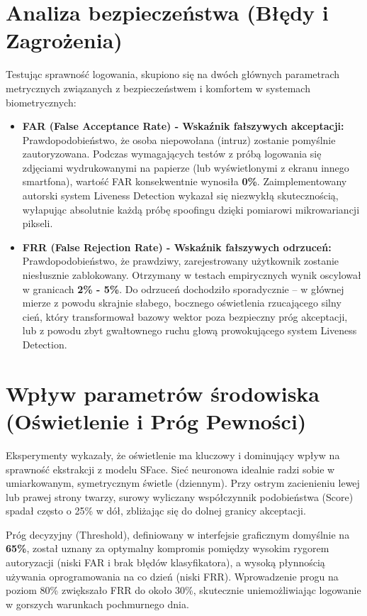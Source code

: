 \section{Analiza bezpieczeństwa (Błędy i Zagrożenia)}
Testując sprawność logowania, skupiono się na dwóch głównych parametrach metrycznych związanych z bezpieczeństwem i komfortem w systemach biometrycznych:

\begin{itemize}
    \item \textbf{FAR (False Acceptance Rate) - Wskaźnik fałszywych akceptacji:} Prawdopodobieństwo, że osoba niepowołana (intruz) zostanie pomyślnie zautoryzowana. Podczas wymagających testów z próbą logowania się zdjęciami wydrukowanymi na papierze (lub wyświetlonymi z ekranu innego smartfona), wartość FAR konsekwentnie wynosiła \textbf{0\%}. Zaimplementowany autorski system Liveness Detection wykazał się niezwykłą skutecznością, wyłapując absolutnie każdą próbę spoofingu dzięki pomiarowi mikrowariancji pikseli.
    
    \item \textbf{FRR (False Rejection Rate) - Wskaźnik fałszywych odrzuceń:} Prawdopodobieństwo, że prawdziwy, zarejestrowany użytkownik zostanie niesłusznie zablokowany. Otrzymany w testach empirycznych wynik oscylował w granicach \textbf{2\% - 5\%}. Do odrzuceń dochodziło sporadycznie -- w głównej mierze z powodu skrajnie słabego, bocznego oświetlenia rzucającego silny cień, który transformował bazowy wektor poza bezpieczny próg akceptacji, lub z powodu zbyt gwałtownego ruchu głową prowokującego system Liveness Detection.
\end{itemize}

\section{Wpływ parametrów środowiska (Oświetlenie i Próg Pewności)}
Eksperymenty wykazały, że oświetlenie ma kluczowy i dominujący wpływ na sprawność ekstrakcji z modelu SFace. Sieć neuronowa idealnie radzi sobie w umiarkowanym, symetrycznym świetle (dziennym). Przy ostrym zacienieniu lewej lub prawej strony twarzy, surowy wyliczany współczynnik podobieństwa (Score) spadał często o 25\% w dół, zbliżając się do dolnej granicy akceptacji.

Próg decyzyjny (Threshold), definiowany w interfejsie graficznym domyślnie na \textbf{65\%}, został uznany za optymalny kompromis pomiędzy wysokim rygorem autoryzacji (niski FAR i brak błędów klasyfikatora), a wysoką płynnością używania oprogramowania na co dzień (niski FRR). Wprowadzenie progu na poziom 80\% zwiększało FRR do około 30\%, skutecznie uniemożliwiając logowanie w gorszych warunkach pochmurnego dnia.

